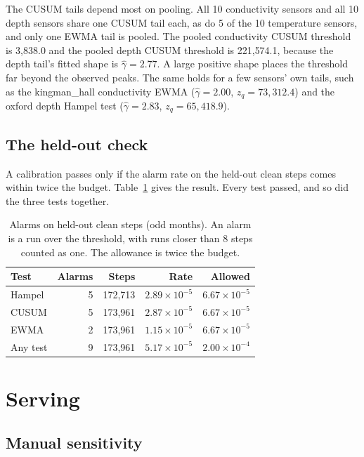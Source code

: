 \documentclass{article}
\begin{document}
The CUSUM tails depend most on pooling. All 10 conductivity sensors and all 10
depth sensors share one CUSUM tail each, as do 5 of the 10 temperature sensors,
and only one EWMA tail is pooled. The pooled conductivity CUSUM threshold is
3{,}838.0 and the pooled depth CUSUM threshold is 221{,}574.1, because the
depth tail's fitted shape is $\hat{\gamma} = 2.77$. A large positive shape
places the threshold far beyond the observed peaks. The same holds for a few
sensors' own tails, such as the kingman\_hall conductivity EWMA
($\hat{\gamma} = 2.00$, $z_{q} = 73{,}312.4$) and the oxford depth Hampel test
($\hat{\gamma} = 2.83$, $z_{q} = 65{,}418.9$).

\subsection{The held-out check}
\label{sec:heldout}

A calibration passes only if the alarm rate on the held-out clean steps comes
within twice the budget. Table~\ref{tab:heldout} gives the result. Every test
passed, and so did the three tests together.

\begin{table}[t]
  \centering
  \caption{Alarms on held-out clean steps (odd months). An alarm is a run over
    the threshold, with runs closer than 8 steps counted as one. The allowance
    is twice the budget.}
  \label{tab:heldout}
  \begin{tabular}{lrrrr}
    \toprule
    Test & Alarms & Steps & Rate & Allowed \\
    \midrule
    Hampel   & 5 & 172{,}713 & $2.89 \times 10^{-5}$ & $6.67 \times 10^{-5}$ \\
    CUSUM    & 5 & 173{,}961 & $2.87 \times 10^{-5}$ & $6.67 \times 10^{-5}$ \\
    EWMA     & 2 & 173{,}961 & $1.15 \times 10^{-5}$ & $6.67 \times 10^{-5}$ \\
    Any test & 9 & 173{,}961 & $5.17 \times 10^{-5}$ & $2.00 \times 10^{-4}$ \\
    \bottomrule
  \end{tabular}
\end{table}

\section{Serving}
\label{sec:serving}

\subsection{Manual sensitivity}
\label{sec:sensitivity}
\end{document}
